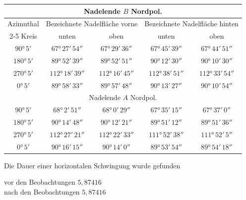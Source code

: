 \documentclass[12pt,a4paper]{article}
\begin{document}
\begin{center}
\small
\begin{tabular}{|c|c|c|c|c|}
\hline
\multicolumn{5}{|c|}{Nadelende $B$ Nordpol.} \\
\hline
Azimuthal & \multicolumn{2}{c|}{Bezeichnete Nadelfläche vorne} & \multicolumn{2}{c|}{Bezeichnete Nadelfläche hinten} \\
\cline{2-5}
Kreis & unten & oben & unten & oben \\
\hline
$90°\,5'$ & $67°\,27'\,54''$ & $67°\,29'\,36''$ & $67°\,45'\,39''$ & $67°\,44'\,51''$ \\
$180°\,5'$ & $89°\,52'\,39''$ & $89°\,52'\,51''$ & $90°\,12'\,30''$ & $90°\,10'\,30''$ \\
$270°\,5'$ & $112°\,18'\,39''$ & $112°\,16'\,45''$ & $112°\,38'\,51''$ & $112°\,33'\,54''$ \\
$0°\,5'$ & $89°\,58'\,33''$ & $89°\,57'\,48''$ & $90°\,13'\,27''$ & $90°\,10'\,54''$ \\
\hline
\multicolumn{5}{|c|}{Nadelende $A$ Nordpol.} \\
\hline
$90°\,5'$ & $68°\,2'\,51''$ & $68°\,0'\,29''$ & $67°\,35'\,15''$ & $67°\,37'\,0''$ \\
$180°\,5'$ & $90°\,14'\,48''$ & $90°\,12'\,21''$ & $89°\,51'\,12''$ & $89°\,51'\,36''$ \\
$270°\,5'$ & $112°\,27'\,21''$ & $112°\,22'\,33''$ & $111°\,52'\,38''$ & $111°\,52'\,5''$ \\
$0°\,5'$ & $90°\,16'\,15''$ & $90°\,14'\,0''$ & $89°\,53'\,54''$ & $89°\,54'\,18''$ \\
\hline
\end{tabular}
\end{center}

Die Dauer einer horizontalen Schwingung wurde gefunden
\begin{center}
vor den Beobachtungen \dotfill $5{,}87416$ \\
nach den Beobachtungen \dotfill $5{,}87416$
\end{center}
\end{document}
